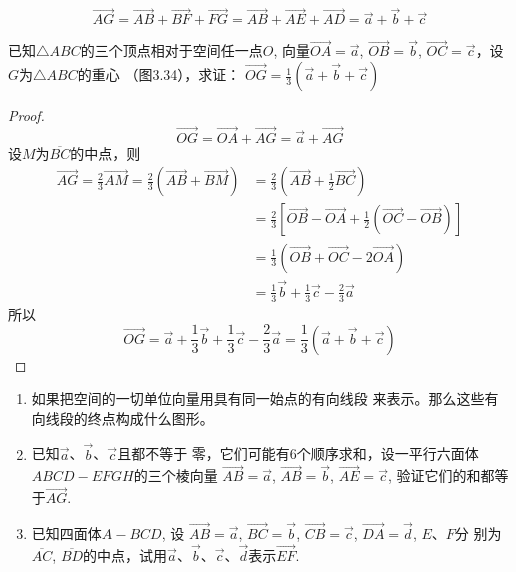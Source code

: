 \begin{solution}
\[\Vec{AG}=\Vec{AB}+\Vec{BF}+\Vec{FG}=\Vec{AB}+\Vec{AE}+\Vec{AD}=\vec{a}+\vec{b}+\vec{c}\]
\end{solution}

\begin{example}
    已知$\triangle ABC$的三个顶点相对于空间任一点$O$, 
 向量$\Vec{OA}=\vec{a}$, $\vec{OB}=\vec{b}$, $\Vec{OC}=\vec{c}$，设$G$为$\triangle ABC$的重心
    （图3.34），求证：
$\Vec{OG}=\frac{1}{3}\left(\vec{a}+\vec{b}+\vec{c}\right)$
\end{example}

\begin{figure}[htp]
    \centering
{}
    \caption{}
\end{figure}


\begin{proof}
\[\Vec{OG}=\Vec{OA}+\Vec{AG}=\vec{a}+\Vec{AG}\]
设$M$为$\overline{BC}$的中点，则
\[\begin{split}
\Vec{AG}=\frac{2}{3}\Vec{AM}=\frac{2}{3}\left(\Vec{AB}+\Vec{BM}\right)&=\frac{2}{3}\left(\Vec{AB}+\frac{1}{2}\Vec{BC}\right)\\
&=\frac{2}{3}\left[\Vec{OB}-\Vec{OA}+\frac{1}{2}\left(\Vec{OC}-\Vec{OB}\right)\right]\\
&=\frac{1}{3}\left(\Vec{OB}+\Vec{OC}-2\Vec{OA}\right)\\
&=\frac{1}{3}\vec{b}+\frac{1}{3}\vec{c}-\frac{2}{3}\vec{a}
\end{split}\]
所以
\[\Vec{OG}=\vec{a}+\frac{1}{3}\vec{b}+\frac{1}{3}\vec{c}-\frac{2}{3}\vec{a}=\frac{1}{3}\left(\vec{a}+\vec{b}+\vec{c}\right)\]
\end{proof}

\begin{ex}
    \begin{enumerate}
        \item 如果把空间的一切单位向量用具有同一始点的有向线段
        来表示。那么这些有向线段的终点构成什么图形。
\item 已知$\vec{a}$、$\vec{b}$、$\vec{c}$且都不等于
零，它们可能有6个顺序求和，设一平行六面体$ABCD
-EFGH$的三个棱向量
$\Vec{AB}=\vec{a}$, $\Vec{AB}=\vec{b}$, $\Vec{AE}=\vec{c}$, 验证它们的和都等于$\Vec{AG}$.
\item 已知四面体$A-BCD$, 设
$\Vec{AB}=\vec{a}$, $\Vec{BC}=\vec{b}$, $\Vec{CB}=\vec{c}$, $\Vec{DA}=\vec{d}$, $E$、$F$分
别为$\overline{AC}$, $\overline{BD}$的中点，试用$\vec{a}$、$\vec{b}$、$\vec{c}$、$\vec{d}$表示$\Vec{EF}$.
    \end{enumerate}
\end{ex}


